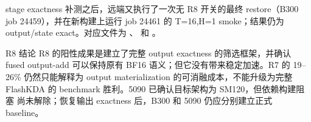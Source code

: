 stage exactness 补测之后，远端又执行了一次无 R8 开关的最终 restore（B300
job 24459），并在新构建上运行 job 24461 的 T=16,H=1 smoke；结果仍为
output/state exact。对应文件为
、
 和
。

\begin{record}{R8 结论}
R8 的阳性成果是建立了完整 output exactness 的筛选框架，并确认 fused
output-add 可以保持原有 BF16 语义；但它没有带来稳定加速。R7 的 19--26\%
仍然只能解释为 output materialization 的可消融成本，不能升级为完整
FlashKDA 的 benchmark 胜利。5090 已确认目标架构为 SM120，但依赖构建阻塞
尚未解除；恢复输出 exactness 后，B300 和 5090 仍应分别建立正式 baseline。
\end{record}
